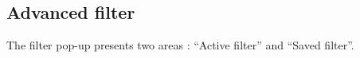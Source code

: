 \documentclass[letterpaper,10pt,english]{sphinxmanual}
\begin{document}
\subsection{Advanced filter}
\label{Gui:advanced-filter}\label{Gui:gui-advanced-filter-label}\begin{figure}[htbp]
\centering

\end{figure}

The filter pop-up presents two areas : “Active filter” and “Saved filter”.
\end{document}
